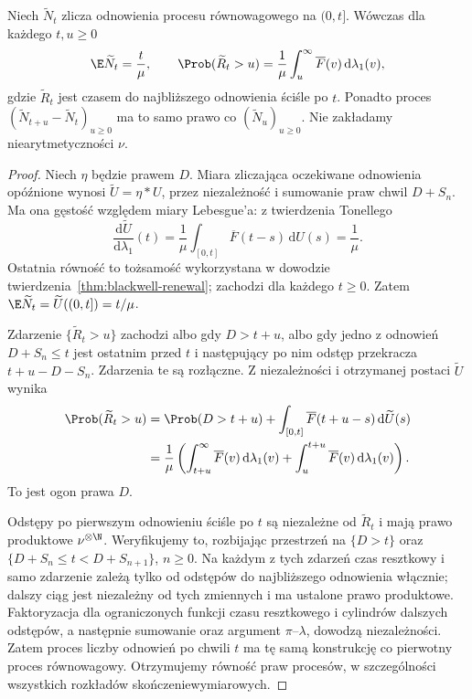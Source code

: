 \begin{twierdzenie}
\label{thm:renewal-equilibrium}
Niech $\widetilde N_t$ zlicza odnowienia procesu
równowagowego na $(0,t]$.
Wówczas dla każdego $t,u\ge0$
\[
\E\widetilde N_t=\frac t\mu,\qquad
\Prob(\widetilde R_t>u)=
\frac1\mu\int_u^\infty\overline F(v)\,\mathrm d\lambda_1(v),
\]
gdzie $\widetilde R_t$ jest czasem do najbliższego
odnowienia ściśle po $t$. Ponadto proces
$(\widetilde N_{t+u}-\widetilde N_t)_{u\ge0}$
ma to samo prawo co $(\widetilde N_u)_{u\ge0}$.
Nie zakładamy niearytmetyczności $\nu$.
\end{twierdzenie}
\begin{proof}
Niech $\eta$ będzie prawem $D$. Miara zliczająca
oczekiwane odnowienia opóźnione wynosi
$\widetilde U=\eta*U$, przez niezależność i
sumowanie praw chwil $D+S_n$.
Ma ona gęstość względem miary Lebesgue'a:
z twierdzenia Tonellego
\[
\frac{\mathrm d\widetilde U}{\mathrm d\lambda_1}(t)
=\frac1\mu\int_{[0,t]}\overline F(t-s)\,\mathrm dU(s)
=\frac1\mu.
\]
Ostatnia równość to tożsamość wykorzystana
w dowodzie twierdzenia~\ref{thm:blackwell-renewal};
zachodzi dla każdego $t\ge0$.
Zatem $\E\widetilde N_t=\widetilde U((0,t])=t/\mu$.

Zdarzenie $\{\widetilde R_t>u\}$ zachodzi albo
gdy $D>t+u$, albo gdy jedno z odnowień
$D+S_n\le t$ jest ostatnim przed $t$ i następujący
po nim odstęp przekracza $t+u-D-S_n$.
Zdarzenia te są rozłączne. Z niezależności i
otrzymanej postaci $\widetilde U$ wynika
\[
\begin{aligned}
\Prob(\widetilde R_t>u)
&=\Prob(D>t+u)+
\int_{[0,t]}\overline F(t+u-s)\,\mathrm d\widetilde U(s)\\
&=\frac1\mu\left(
\int_{t+u}^\infty\overline F(v)\,\mathrm d\lambda_1(v)
+\int_u^{t+u}\overline F(v)\,\mathrm d\lambda_1(v)\right).
\end{aligned}
\]
To jest ogon prawa $D$.

Odstępy po pierwszym odnowieniu ściśle po $t$
są niezależne od $\widetilde R_t$ i mają prawo
produktowe $\nu^{\otimes\N}$.
Weryfikujemy to, rozbijając przestrzeń na
$\{D>t\}$ oraz $\{D+S_n\le t<D+S_{n+1}\}$,
$n\ge0$. Na każdym z tych zdarzeń czas resztkowy
i samo zdarzenie zależą tylko od odstępów do
najbliższego odnowienia włącznie; dalszy ciąg
jest niezależny od tych zmiennych i ma ustalone
prawo produktowe. Faktoryzacja dla ograniczonych
funkcji czasu resztkowego i cylindrów dalszych
odstępów, a następnie sumowanie oraz argument
$\pi$--$\lambda$, dowodzą niezależności.
Zatem proces liczby odnowień po chwili $t$
ma tę samą konstrukcję co pierwotny proces
równowagowy. Otrzymujemy równość praw procesów,
w szczególności wszystkich rozkładów
skończeniewymiarowych.
\end{proof}

